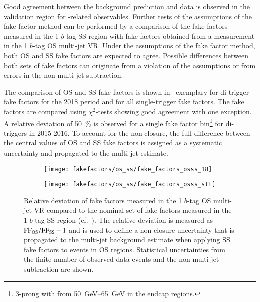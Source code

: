 Good agreement between the background prediction and data is observed
in the validation region for \tauhadvis-related observables. Further
tests of the assumptions of the fake factor method can be performed by
a comparison of the fake factors measured in the 1 $b$-tag SS region
with fake factors obtained from a measurement in the 1 $b$-tag OS
multi-jet VR. Under the assumptions of the fake factor method, both OS
and SS fake factors are expected to agree. Possible differences
between both sets of fake factors can originate from a violation of
the assumptions or from errors in the non-multi-jet subtraction.

The comparison of OS and SS fake factors is shown
in~ exemplary for di-\tauhadvis trigger
fake factors for the 2018 period and for all single-\tauhadvis trigger
fake factors. The fake factors are compared using $\chi^2$-tests
showing good agreement with one exception. A relative deviation of
\SI{50}{\percent} is observed for a single fake factor
bin\footnote{3-prong \tauhadvis with \pT from \SIrange{50}{65}{\GeV}
  in the endcap regions.} for di-\tauhadvis triggers in 2015-2016. To
account for the non-closure, the full difference between the central
values of OS and SS fake factors is assigned as a systematic
uncertainty and propagated to the multi-jet estimate.

\begin{figure}[htbp]
  \centering

  \begin{subfigure}[t]{0.48\textwidth}
    \texttt{[image: fakefactors/os\_ss/fake\_factors\_osss\_18]}
    \label{fig:fake_factor_OSSS_dtt}
  \end{subfigure}\hfill%
  \begin{subfigure}[t]{0.48\textwidth}
    \texttt{[image: fakefactors/os\_ss/fake\_factors\_osss\_stt]}
    \label{fig:fake_factor_OSSS_stt}
  \end{subfigure}

  \caption{Relative deviation of fake factors measured in the 1
    $b$-tag OS multi-jet VR compared to the nominal set of fake
    factors measured in the 1 $b$-tag SS region (cf.\
    ). The relative
    deviation is measured as $\text{FF}_\text{OS} / \text{FF}_\text{SS} - 1$ and
    is used to define a non-closure uncertainty that is propagated to
    the multi-jet background estimate when applying SS fake factors to
    events in OS regions. Statistical uncertainties from the finite
    number of observed data events and the non-multi-jet subtraction
    are shown.}
  \label{fig:fake_factor_OSSS}
\end{figure}



